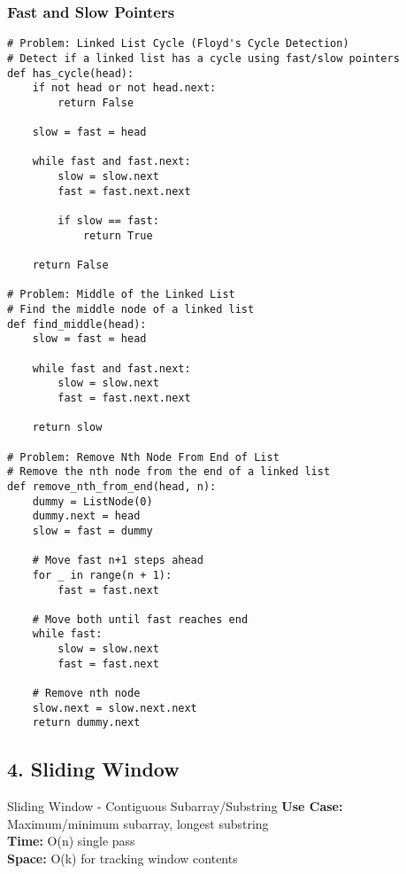 \documentclass[10pt,a4paper]{article}
\begin{document}
\subsubsection{Fast and Slow Pointers}
\begin{lstlisting}
# Problem: Linked List Cycle (Floyd's Cycle Detection)
# Detect if a linked list has a cycle using fast/slow pointers
def has_cycle(head):
    if not head or not head.next:
        return False

    slow = fast = head

    while fast and fast.next:
        slow = slow.next
        fast = fast.next.next

        if slow == fast:
            return True

    return False

# Problem: Middle of the Linked List
# Find the middle node of a linked list
def find_middle(head):
    slow = fast = head

    while fast and fast.next:
        slow = slow.next
        fast = fast.next.next

    return slow

# Problem: Remove Nth Node From End of List
# Remove the nth node from the end of a linked list
def remove_nth_from_end(head, n):
    dummy = ListNode(0)
    dummy.next = head
    slow = fast = dummy

    # Move fast n+1 steps ahead
    for _ in range(n + 1):
        fast = fast.next

    # Move both until fast reaches end
    while fast:
        slow = slow.next
        fast = fast.next

    # Remove nth node
    slow.next = slow.next.next
    return dummy.next
\end{lstlisting}

\subsection{4. Sliding Window}

\begin{patternbox}{Sliding Window - Contiguous Subarray/Substring}
\textbf{Use Case:} Maximum/minimum subarray, longest substring\\
\textbf{Time:} O(n) single pass\\
\textbf{Space:} O(k) for tracking window contents
\end{patternbox}
\end{document}
